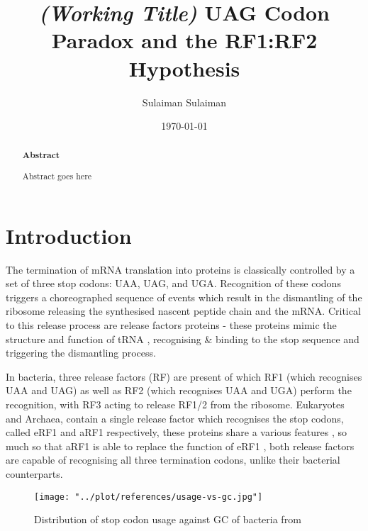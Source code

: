 \documentclass[
    emulatestandardclasses,
    parskip=half,
]{scrartcl}
\begin{document}
    \title{\textit{(Working Title)} UAG Codon Paradox and the RF1:RF2 Hypothesis}
    \date{\today}
    \author{Sulaiman Sulaiman}
    \maketitle

    \begin{abstract}
        {\textbf{Abstract}\vspace{1em}}

        Abstract goes here
    \end{abstract}

    \section{Introduction}
        The termination of mRNA translation into proteins is classically controlled by a set of three stop codons: UAA, UAG, and UGA. Recognition of these codons triggers a choreographed sequence of events which result in the dismantling of the ribosome releasing the synthesised nascent peptide chain and the mRNA. Critical to this release process are release factors proteins - these proteins mimic the structure and function of tRNA \autocite{Nakamura2003}, recognising \& binding to the stop sequence and triggering the dismantling process.

        In bacteria, three release factors (RF) are present of which RF1 (which recognises UAA and UAG) as well as RF2 (which recognises UAA and UGA) perform the recognition, with RF3 acting to release RF1/2 from the ribosome. Eukaryotes and Archaea, contain a single release factor which recognises the stop codons, called eRF1 and aRF1 respectively, these proteins share a various features \autocite{Alkalaeva2009}, so much so that aRF1 is able to replace the function of eRF1 \autocite{Dontsova2000}, both release factors are capable of recognising all three termination codons, unlike their bacterial counterparts.

        \begin{wrapfigure}{r}{7.5cm}
            \centering
            \texttt{[image: "../plot/references/usage-vs-gc.jpg"]}
            \caption{Distribution of stop codon usage against GC of bacteria from \mancite\cite{Korkmaz2014}}
            \label{fig:intro/codon-gc}
        \end{wrapfigure}
\end{document}
